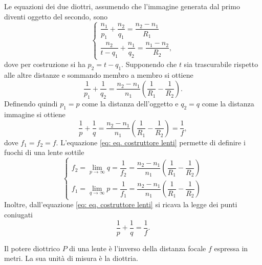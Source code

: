 Le equazioni dei due diottri, assumendo che l'immagine generata dal primo diventi oggetto del secondo, sono
\begin{equation}
    \begin{cases}
        \dfrac{n_1}{p_1}+\dfrac{n_2}{q_1}=\dfrac{n_2-n_1}{R_1} \\[2ex]
        \dfrac{n_2}{t-q_1}+\dfrac{n_1}{q_2}=\dfrac{n_1-n_2}{R_2},
    \end{cases}
\end{equation}
dove per costruzione si ha $p_2=t-q_1$. Supponendo che $t$ sia trascurabile rispetto alle altre distanze e sommando membro a membro si ottiene
\begin{equation}
    \frac{1}{p_1}+\frac{1}{q_2}=\frac{n_2-n_1}{n_1}\left(\frac{1}{R_1}-\frac{1}{R_2}\right).
\end{equation}
Definendo quindi $p_1=p$ come la distanza dell'oggetto e $q_2=q$ come la distanza immagine si ottiene
\begin{equation}
    \label{eq: eq. costruttore lenti}
    \frac{1}{p}+\frac{1}{q}=\frac{n_2-n_1}{n_1}\left(\frac{1}{R_1}-\frac{1}{R_2}\right)=\dfrac{1}{f},
\end{equation}
dove $f_1=f_2=f$.
L'equazione \eqref{eq: eq. costruttore lenti} permette di definire i fuochi di una lente sottile
\begin{equation}
    \begin{cases}
        f_2=\lim_{p\to\infty}{q}=\dfrac{1}{f_2}=\dfrac{n_2-n_1}{n_1}\left(\dfrac{1}{R_1}-\dfrac{1}{R_2}\right) \\[2ex]
        f_1=\lim_{q\to\infty}{p}=\dfrac{1}{f_1}=\dfrac{n_2-n_1}{n_1}\left(\dfrac{1}{R_1}-\dfrac{1}{R_2}\right)
    \end{cases}
\end{equation}
Inoltre, dall'equazione \eqref{eq: eq. costruttore lenti} si ricava la legge dei punti coniugati
\begin{equation}
    \label{eq: legge dei punti coniugati}
    \frac{1}{p}+\frac{1}{q}=\frac{1}{f}.
\end{equation}
\begin{defn}
    Il potere diottrico $P$ di una lente è l'inverso della distanza focale $f$ espressa in metri. La sua unità di misura è la diottria.
\end{defn}

